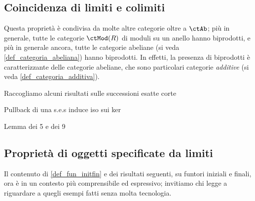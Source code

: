 \subsection{Coincidenza di limiti e colimiti}

\begin{definition}\label{def_biprodotti}
 \Todo{}
\end{definition}
Questa proprietà è condivisa da molte altre categorie oltre a \(\ctAb\); più in generale, tutte le categorie \(\ctMod(R)\) di moduli su un anello hanno biprodotti, e più in generale ancora, tutte le categorie abeliane (si veda \ref{def_categoria_abeliana}) hanno biprodotti. In effetti, la presenza di biprodotti è caratterizzante delle categorie abeliane, che sono particolari categorie \emph{additive} (si veda \ref{def_categoria_additiva}).
\begin{definition}\label{def_quadrati_esatti}
 \Todo{}
\end{definition}
\begin{proposition}
\end{proposition}
\begin{proposition}\label{prop_esattezza_successioni_esatte_corte}
 \Todo{}
\end{proposition}
Raccogliamo alcuni risultati sulle successioni esatte corte
\begin{proposition}
 Pullback di una s.e.s induce iso sui ker
\end{proposition}
\begin{proposition}
 Lemma dei 5 e dei 9
\end{proposition}
\begin{definition}\label{def_categoria_abeliana}
 \Todo{}
\end{definition}

\subsection{Proprietà di oggetti specificate da limiti}
\begin{definition}\label{def_diagramma_iniziale_finale}
 \Todo{}
\end{definition}
Il contenuto di \ref{def_fun_initfin} e dei risultati seguenti, su funtori iniziali e finali, ora è in un contesto più comprensibile ed espressivo; invitiamo chi legge a riguardare a quegli esempi fatti senza molta tecnologia.

